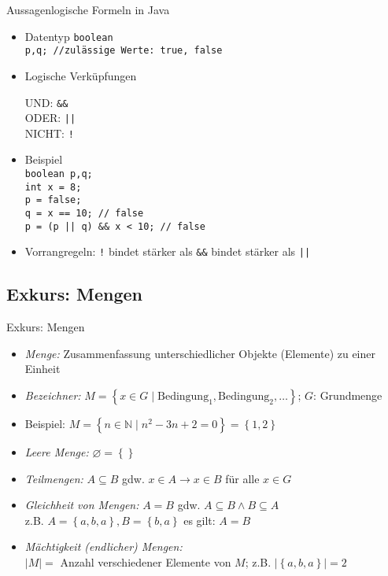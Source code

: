 \begin{frame}{Aussagenlogische Formeln in Java}
	\begin{itemize}
		\item Datentyp \texttt{boolean}\\
		\texttt{p,q; //zulässige Werte: true, false}
		\item Logische Verküpfungen\\
		\begin{tabbing}
			UND: \quad \= \texttt{\&\&}\\
			ODER: \> \texttt{||}\\
			NICHT: \> \texttt{!}
		\end{tabbing}
		\item Beispiel \\
			\texttt{boolean p,q;}\\
			\texttt{int x = 8;}\\
			\texttt{p = false;}\\
			\texttt{q = x == 10; // false}\\
			\texttt{p = (p || q) \&\& x < 10; //  false}
		\item Vorrangregeln: \texttt{!} bindet stärker als \texttt{\&\&} bindet stärker als \texttt{||}
	\end{itemize}
\end{frame}

\subsection{Exkurs: Mengen}

\begin{frame}{Exkurs: Mengen}
	\begin{itemize}
		\item \emph{Menge:} Zusammenfassung unterschiedlicher Objekte (Elemente) zu einer Einheit
		\item \emph{Bezeichner:} $M=\left\{x \in G \mid \textrm{Bedingung}_1, \textrm{Bedingung}_2, \ldots \right\}$; $G$: Grundmenge
		\item Beispiel: $M=\left\{n \in \mathbb{N} \mid n^2-3n+2=0 \right\}=\left\{1,2\right\}$
		\item \emph{Leere Menge:} $\varnothing=\left\{{}\right\}$
		\item \emph{Teilmengen:} $A \subseteq B$ gdw. $x \in A \rightarrow x \in B$ für alle $x \in G$
		\item \emph{Gleichheit von Mengen:} $A=B$ gdw. $A \subseteq B \land B \subseteq A$\\
			z.B. $A = \left\{a, b, a\right\}, B = \left\{b, a\right\}$ es gilt: $A = B$
		\item \emph{Mächtigkeit (endlicher) Mengen:}\\
		$|M|=$ Anzahl verschiedener Elemente von $M$; z.B. $|\left\{a, b, a\right\}|=2$
	\end{itemize}
\end{frame}

